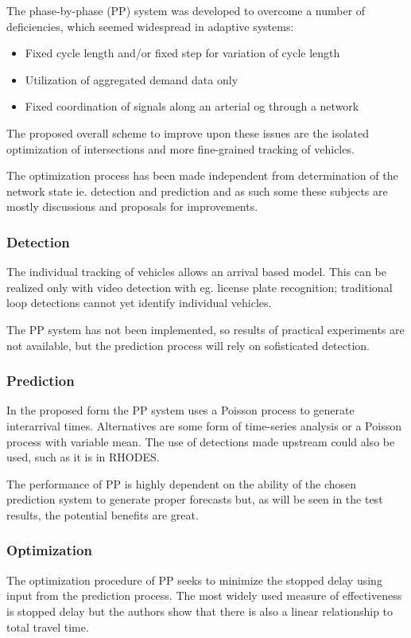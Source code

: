 The phase-by-phase (PP) system was developed to overcome a number of deficiencies, which seemed widespread in adaptive systems:

\begin{itemize}
\item Fixed cycle length and/or fixed step for variation of cycle length
\item Utilization of aggregated demand data only
\item Fixed coordination of signals along an arterial og through a network
\end{itemize}

The proposed overall scheme to improve upon these issues are the isolated optimization of intersections and more fine-grained tracking of vehicles.

The optimization process has been made independent from determination of the network state ie. detection and prediction and as such some these subjects are mostly discussions and proposals for improvements.

\subsubsection*{Detection}
The individual tracking of vehicles allows an arrival based model. This can be realized only with video detection with eg. license plate recognition; traditional loop detections cannot yet identify individual vehicles.

The PP system has not been implemented, so results of practical experiments are not available, but the prediction process will rely on sofisticated detection.

\subsubsection*{Prediction}
In the proposed form the PP system uses a Poisson process to generate interarrival times.
Alternatives are some form of time-series analysis or a Poisson process with variable mean. The use of detections made upstream could also be used, such as it is in RHODES.

The performance of PP is highly dependent on the ability of the chosen prediction system to generate proper forecasts but, as will be seen in the test results, the potential benefits are great.

\subsubsection*{Optimization}
The optimization procedure of PP seeks to minimize the stopped delay using input from the prediction process. The most widely used measure of effectiveness is stopped delay but the authors show that there is also a linear relationship to total travel time.

